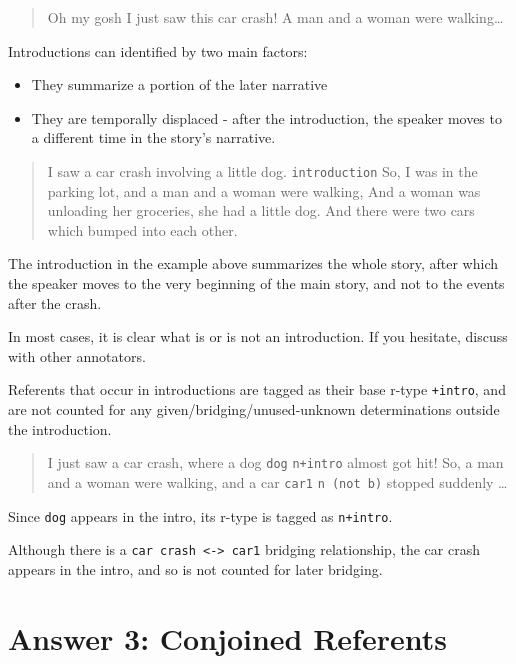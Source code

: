 \documentclass[
]{book}
\providecommand{\tightlist}{%
  \setlength{\itemsep}{0pt}\setlength{\parskip}{0pt}}
\begin{document}
\begin{quote}
Oh my gosh I just saw this car crash!
A man and a woman were walking\ldots{}
\end{quote}

Introductions can identified by two main factors:

\begin{itemize}
\tightlist
\item
  They summarize a portion of the later narrative
\item
  They are temporally displaced - after the introduction,
  the speaker moves to a different time in the story's narrative.
\end{itemize}

\begin{quote}
I saw a car crash involving a little dog. \texttt{introduction}
So, I was in the parking lot, and a man and a woman were walking,
And a woman was unloading her groceries, she had a little dog.
And there were two cars which bumped into each other.
\end{quote}

The introduction in the example above summarizes the whole story,
after which the speaker moves to the very beginning of the main story,
and not to the events after the crash.

In most cases, it is clear what is or is not an introduction.
If you hesitate, discuss with other annotators.

Referents that occur in introductions are tagged as their base r-type \texttt{+intro},
and are not counted for any given/bridging/unused-unknown determinations
outside the introduction.

\begin{quote}
I just saw a car crash, where a dog \texttt{dog} \texttt{n+intro} almost got hit!
So, a man and a woman were walking, and a car \texttt{car1} \texttt{n\ (not\ b)} stopped suddenly \ldots{}
\end{quote}

Since \texttt{dog} appears in the intro, its r-type is tagged as \texttt{n+intro}.

Although there is a \texttt{car\ crash\ \textless{}-\textgreater{}\ car1} bridging relationship,
the car crash appears in the intro, and so is not counted for later bridging.

\hypertarget{answer-3-conjoined-referents}{%
\chapter{Answer 3: Conjoined Referents}\label{answer-3-conjoined-referents}}
\end{document}
